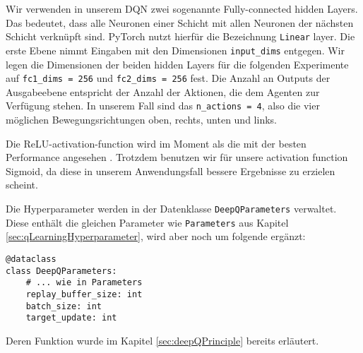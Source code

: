 Wir verwenden in unserem DQN zwei sogenannte Fully-connected hidden Layers. Das bedeutet, dass alle Neuronen einer Schicht mit allen Neuronen der nächsten Schicht verknüpft sind. PyTorch nutzt hierfür die Bezeichnung \texttt{Linear} layer. Die erste Ebene nimmt Eingaben mit den Dimensionen \texttt{input_dims} entgegen. Wir legen die Dimensionen der beiden hidden Layers für die folgenden Experimente auf \texttt{fc1_dims = 256} und \texttt{fc2_dims = 256} fest. Die Anzahl an Outputs der Ausgabeebene entspricht der Anzahl der Aktionen, die dem Agenten zur Verfügung stehen. In unserem Fall sind das \texttt{n_actions = 4}, also die vier möglichen Bewegungsrichtungen oben, rechts, unten und links.

Die ReLU-activation-function wird im Moment als die mit der besten Performance angesehen \cite{10_stevens2020deep}. Trotzdem benutzen wir für unsere activation function Sigmoid, da diese in unserem Anwendungsfall bessere Ergebnisse zu erzielen scheint. 

Die Hyperparameter werden in der Datenklasse \texttt{DeepQParameters} verwaltet. Diese enthält die gleichen Parameter wie \texttt{Parameters} aus Kapitel \ref{sec:qLearningHyperparameter}, wird aber noch um folgende ergänzt:
\begin{verbatim}
@dataclass
class DeepQParameters:
    # ... wie in Parameters
    replay_buffer_size: int
    batch_size: int
    target_update: int
\end{verbatim}
Deren Funktion wurde im Kapitel \ref{sec:deepQPrinciple} bereits erläutert.